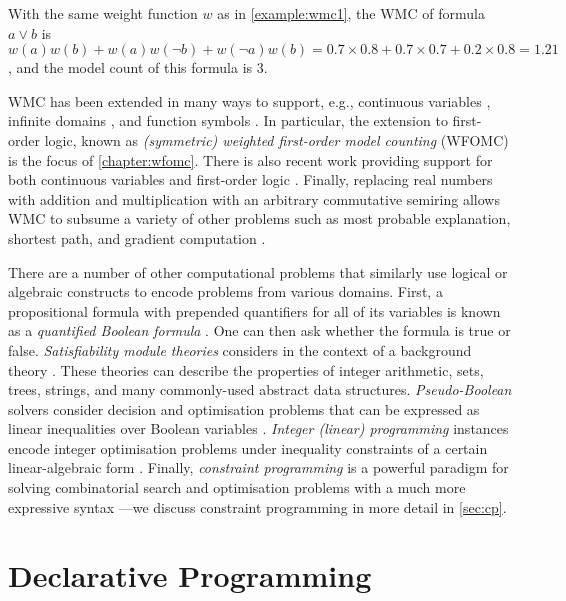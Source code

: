 \begin{example}
  With the same weight function $w$ as in \cref{example:wmc1}, the WMC of formula $a \lor b$ is $w(a)w(b) + w(a)w(\neg b) + w(\neg a)w(b) = 0.7 \times 0.8 + 0.7 \times 0.7 + 0.2 \times 0.8 = 1.21$, and the model count of this formula is 3.
\end{example}

WMC has been extended in many ways to support, e.g., continuous variables \citep{DBLP:conf/ijcai/BellePB15}, infinite domains \citep{DBLP:conf/aaai/Belle17}, and function symbols \citep{DBLP:conf/uai/Belle17}. In particular, the extension to first-order logic, known as \emph{(symmetric) weighted first-order model counting} (WFOMC) \citep{DBLP:journals/cacm/GogateD16,DBLP:conf/ijcai/BroeckTMDR11} is the focus of \cref{chapter:wfomc}. There is also recent work providing support for both continuous variables and first-order logic \citep{DBLP:conf/uai/FeldsteinB21}. Finally, replacing real numbers with addition and multiplication with an arbitrary commutative semiring allows WMC to subsume a variety of other problems such as most probable explanation, shortest path, and gradient computation \citep{DBLP:journals/ijar/BelleR20,DBLP:journals/japll/KimmigBR17}.

There are a number of other computational problems that similarly use logical or algebraic constructs to encode problems from various domains. First, a propositional formula with prepended quantifiers for all of its variables is known as a \emph{quantified Boolean formula} \citep{DBLP:series/faia/BuningB09}. One can then ask whether the formula is true or false. \emph{Satisfiability module theories} considers \SAT{} in the context of a background theory \citep{DBLP:series/faia/BarrettSST09}. These theories can describe the properties of integer arithmetic, sets, trees, strings, and many commonly-used abstract data structures. \emph{Pseudo-Boolean} solvers consider decision and optimisation problems that can be expressed as linear inequalities over Boolean variables \citep{DBLP:series/faia/RousselM09}. \emph{Integer (linear) programming} instances encode integer optimisation problems under inequality constraints of a certain linear-algebraic form \citep{wolsey2020integer}. Finally, \emph{constraint programming} is a powerful paradigm for solving combinatorial search and optimisation problems with a much more expressive syntax \citep{DBLP:reference/fai/2}---we discuss constraint programming in more detail in \cref{sec:cp}.

\section{Declarative Programming} \label{sec:declarative}

